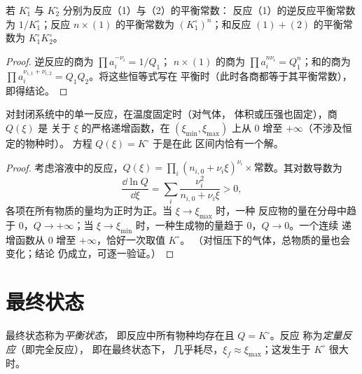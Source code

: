 \begin{proposition}[平衡常数的组合]\label{prop:b1:extent-q-and-k:combine-k}
若 $K_1^\circ$ 与 $K_2^\circ$ 分别为反应（1）与（2）的平衡常数：
反应（1）的逆反应平衡常数为 $1/K_1^\circ$；反应 $n \times
(1)$ 的平衡常数为 $(K_1^\circ)^n$；和反应 $(1) + (2)$ 的平衡常数为 $K_1^\circ K_2^\circ$。
\end{proposition}

\begin{proof}
逆反应的商为 $\prod a_i^{-\nu_i} = 1/Q_1$；
$n \times (1)$ 的商为 $\prod a_i^{n\nu_i} = Q_1^n$；和的商为
$\prod a_i^{\nu_{i,1} + \nu_{i,2}} = Q_1 Q_2$。将这些恒等式写在
平衡时（此时各商都等于其平衡常数），即得结论。
\end{proof}

\begin{proposition}[唯一平衡状态]\label{prop:b1:extent-q-and-k:q-monotone}
对封闭系统中的单一反应，在温度固定时（对气体，
体积或压强也固定），商 $Q(\xi)$ 是
关于 $\xi$ 的严格递增函数，在 $(\xi_{\min}, \xi_{\max})$ 上从 0
增至 $+\infty$（不涉及恒定的物种时）。
方程 $Q(\xi) = K^\circ$ 于是在此
区间内恰有一个解。
\end{proposition}

\begin{proof}
考虑溶液中的反应，$Q(\xi) = \prod_i (n_{i,0} + \nu_i\xi)^{\nu_i}
\times \text{常数}$。其对数导数为
\[
  \frac{\dd \ln Q}{\dd \xi} = \sum_i \frac{\nu_i^2}{n_{i,0} + \nu_i \xi}
  > 0 ,
\]
各项在所有物质的量均为正时为正。当 $\xi \to \xi_{\max}$ 时，一种
反应物的量在分母中趋于 0，$Q \to +\infty$；当 $\xi
\to \xi_{\min}$ 时，一种生成物的量趋于 0，$Q \to 0$。一个连续
递增函数从 0 增至 $+\infty$，恰好一次取值 $K^\circ$。
（对恒压下的气体，总物质的量也会变化；结论
仍成立，可逐一验证。）
\end{proof}

\section{最终状态}

\begin{definition}\label{def:b1:extent-q-and-k:quantitative}
最终状态称为\emph{平衡状态}，
即反应中所有物种均存在且 $Q = K^\circ$。反应
称为\emph{定量反应}（即完全反应），
即在最终状态下，
几乎耗尽，$\xi_f \approx \xi_{\max}$；这发生于 $K^\circ$
很大时。
\end{definition}

